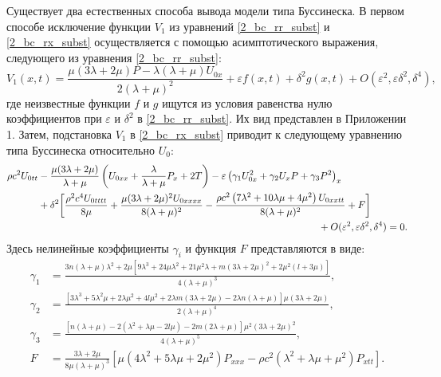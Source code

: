 \documentclass[12pt, a4paper]{report}
\begin{document}
Существует два естественных способа вывода модели типа Буссинеска. В первом способе исключение функции $V_1$ из уравнений \eqref{2_bc_rr_subst} и \eqref{2_bc_rx_subst} осуществляется с помощью асимптотического выражения, следующего из уравнения \eqref{2_bc_rr_subst}:
\begin{equation} \label{v1_asympt}
V_1(x, t) = \frac{ \mu(3\lambda + 2\mu) P - \lambda(\lambda + \mu) U_{0x}}{2(\lambda + \mu)^2} + \varepsilon f(x,t) + \delta^2 g(x,t) + O(\varepsilon^2, \varepsilon\delta^2, \delta^4),
\end{equation}
где неизвестные функции $f$ и $g$ ищутся из условия равенства нулю коэффициентов при $\varepsilon$ и $\delta^2$ в \eqref{2_bc_rr_subst}. Их вид представлен в Приложении 1. Затем, подстановка $V_1$ в \eqref{2_bc_rx_subst} приводит к следующему уравнению типа Буссинеска относительно $U_0$:
\begin{equation} \label{eq_u0_asympt}
\begin{split}
\rho c^2 U_{0tt} &- \frac{\mu(3\lambda + 2\mu)}{\lambda + \mu}\left(U_{0xx} + \frac{\lambda}{\lambda + \mu} P_x + 2T\right) - \varepsilon \left(\gamma_1 U_{0x}^2 + \gamma_2 U_x P + \gamma_3 P^2 \right)_x \\
&+ \delta^2 \bigg[\frac{\rho ^2 c^4 U_{0tttt}}{8\mu} + \frac{\mu (3\lambda + 2\mu)^2 U_{0xxxx}}{8(\lambda + \mu)^2} - \frac{\rho c^2 \left(7\lambda^2 + 10\lambda\mu + 4\mu^2\right) U_{0xxtt}}{8(\lambda + \mu)^2} + F \bigg]\\
&\hspace{100mm}+ O(\varepsilon^2, \varepsilon\delta^2, \delta^4) = 0.
\end{split}
\end{equation}
Здесь нелинейные коэффициенты $\gamma_i$ и функция $F$ представляются в виде:
\begin{align} 
	\nonumber
	\gamma_1 &= \frac{3n(\lambda + \mu)\lambda^2 + 2\mu \left[9\lambda^3 + 24\mu\lambda^2 + 21\mu^2\lambda + m(3\lambda + 2\mu)^2 + 2\mu^2 (l + 3\mu)\right]}{4 (\lambda + \mu)^3},\\
	\nonumber
	\gamma_2 &= \frac{\left[3\lambda^3 + 5\lambda^2\mu + 2\lambda\mu^2 + 4l\mu^2 + 2\lambda m(3\lambda + 2\mu) - 2\lambda n (\lambda + \mu)\right] \mu(3\lambda + 2\mu)}{2(\lambda + \mu)^4},\\
	\nonumber
	\gamma_3 &= \frac{\left[n (\lambda +\mu )-2 \left(\lambda ^2+\lambda  \mu -2 l \mu \right)-2 m (2 \lambda +\mu )\right] \mu^2 (3\lambda + 2\mu)^2}{4(\lambda + \mu)^5},\\
	\nonumber
	F &= \frac{3\lambda + 2\mu}{8\mu(\lambda + \mu)^3}\left[ \mu (4\lambda^2 + 5\lambda\mu + 2\mu^2) P_{xxx} - \rho c^2(\lambda^2 + \lambda\mu + \mu^2) P_{xtt}\right].
\end{align}
\end{document}
